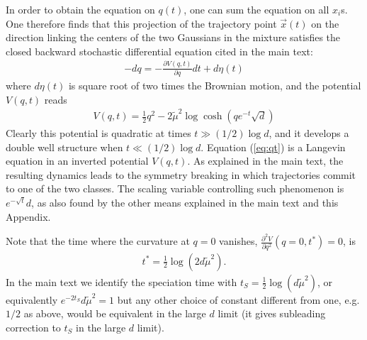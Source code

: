 \documentclass[10pt,twocolumn]{article}
\newcommand{\vx}{\vec x}
\begin{document}
In order to obtain the equation on $q(t)$, one can sum the equation on all $x_i$s.
One therefore finds that this projection of the trajectory point $\vx(t)$
on the direction linking  the centers of the two Gaussians in the mixture satisfies the closed backward stochastic differential equation cited in the main text:
\begin{align}
    -dq=-\frac{\partial V(q,t)}{\partial q}dt+d\eta(t)
\end{align}
where $d\eta(t) $ is square root of two times the Brownian motion, and the potential $V(q,t)$ reads 
\begin{align}
    V(q,t)=\frac{1}{2}q^2-2\tilde \mu^2 \log \cosh\left(q  e^{-t} \sqrt{d}\right)
\end{align}
Clearly this potential is quadratic at times $t\gg (1/2) \log d$, and it develops a double well structure when $t\ll (1/2) \log d$. Equation (\ref{eq:qt}) is a Langevin equation in an inverted potential $V(q,t)$. As explained in the main text, the resulting dynamics leads to the symmetry breaking in which trajectories commit to one of the two classes.  
The scaling variable controlling such phenomenon is $e^{-\sqrt{t}}d$, as also found by the other means explained in the main text and this Appendix. 

Note that the time where the curvature at $q=0$ vanishes,
$ \frac{\partial^2 V }{\partial q^2}(q=0,t^*)=0$,  is 
\begin{align}
    t^*=\frac{1}{2}\log(2d\tilde\mu^2).
\end{align}
In the main text we identify the speciation time with $t_S=\frac{1}{2}\log (d \tilde \mu^2)$, or equivalently $e^{-2t_S}d \tilde \mu^2=1$ but any other choice of constant different from one, e.g. $1/2 $ as above, would be equivalent in the large $d$ limit  (it gives subleading correction to $t_S$ in the large $d$ limit).
\end{document}
